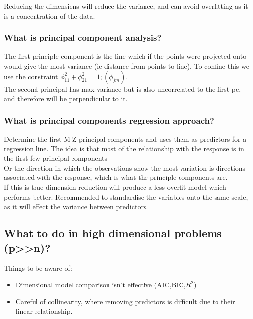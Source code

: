 \documentclass[11pt]{scrartcl} %
\begin{document}
Reducing the dimensions will reduce the variance, and can avoid overfitting as it is a concentration
of the data.

\subsubsection{What is principal component analysis?}

The first principle component is the line which if the points were projected onto would give the
most variance (ie distance from points to line). To confine this we use the constraint 
\(\phi_{11}^2 + \phi_{21}^2 =1; (\phi_{jm})\).\\

The second principal has max variance but is also uncorrelated to the first pc, and therefore will
be perpendicular to it.

\subsubsection{What is principal components regression approach?}

Determine the first M Z principal components and uses them as predictors for a regression line.
The idea is that most of the relationship with the response is in the first few principal components.\\

Or the direction in which the observations show the most variation is directions associated with the response,
which is what the principle components are.\\

If this is true dimension reduction will produce a less overfit model which performs better. Recommended
to standardise the variables onto the same scale, as it will effect the variance between predictors.

\subsection{What to do in high dimensional problems (p>>n)?}

Things to be aware of:

\begin{itemize}
	\item Dimensional model comparison isn't effective (AIC,BIC,\(R^2\))
	\item Careful of collinearity, where removing predictors is difficult due to their linear relationship.
\end{itemize}
\end{document}
